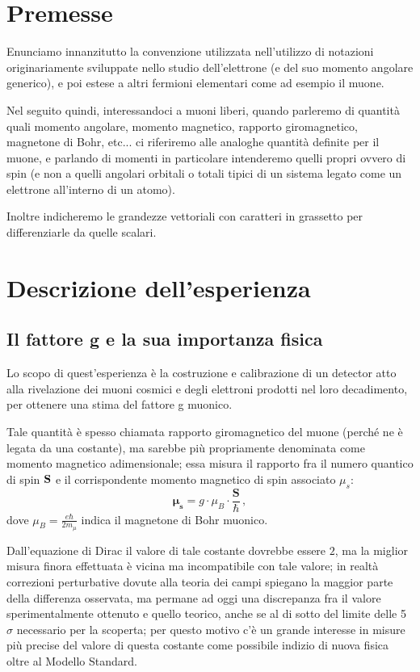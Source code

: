 \section{Premesse}

Enunciamo innanzitutto la convenzione utilizzata nell'utilizzo di notazioni originariamente sviluppate nello studio dell'elettrone (e del suo momento angolare generico), e poi estese a altri fermioni elementari come ad esempio il muone. \par
Nel seguito quindi, interessandoci a muoni liberi, quando parleremo di quantità quali momento angolare, momento magnetico, rapporto giromagnetico, magnetone di Bohr, etc... ci riferiremo alle analoghe quantità definite per il muone, e parlando di momenti in particolare intenderemo quelli propri ovvero di spin (e non a quelli angolari orbitali o totali tipici di un sistema legato come un elettrone all'interno di un atomo). \par
Inoltre indicheremo le grandezze vettoriali con caratteri in grassetto per differenziarle da quelle scalari. \par

\section{Descrizione dell'esperienza}
\subsection{Il fattore g e la sua importanza fisica}
Lo scopo di quest'esperienza è la costruzione e calibrazione di un detector atto alla rivelazione dei muoni cosmici e degli elettroni prodotti nel loro decadimento, per ottenere una stima del fattore g muonico. \par
Tale quantità è spesso chiamata rapporto giromagnetico del muone (perch\'e ne è legata da una costante), ma sarebbe più propriamente denominata come momento magnetico adimensionale; essa misura il rapporto fra il numero quantico di spin $\bf{S}$ e il corrispondente momento magnetico di spin associato $\mu_s$:
\begin{equation}
	\bm{\mu_s}=g\cdot \mu_B\cdot \frac{ \mathbf{S}}{\hbar} \, ,
	\label{eq:magnetic_moment}
\end{equation}
dove $\mu_B=\frac{e \hbar}{2 m_{\mu}}$ indica il magnetone di Bohr muonico. \par
Dall'equazione di Dirac il valore di tale costante dovrebbe essere $2$, ma la miglior misura finora effettuata è vicina ma incompatibile con tale valore; in realtà correzioni perturbative dovute alla teoria dei campi spiegano la maggior parte della differenza osservata, ma permane ad oggi una discrepanza fra il valore sperimentalmente ottenuto e quello teorico, anche se al di sotto del limite delle 5 $\sigma$ necessario per la scoperta; per questo motivo c'è un grande interesse in misure più precise del valore di questa costante come possibile indizio di nuova fisica oltre al Modello Standard. \cite{bib:Bennett:2006fi}
\par

